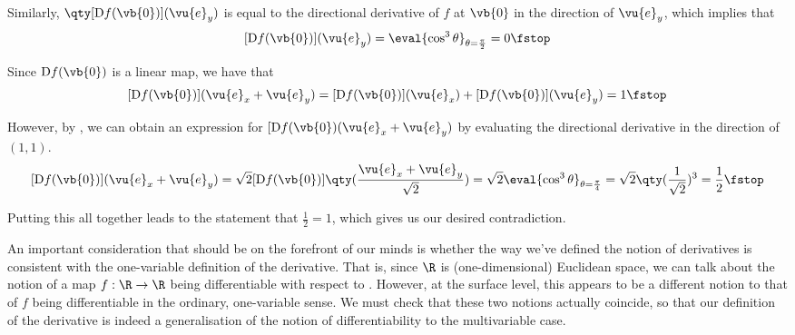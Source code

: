Similarly, \( \qty[\D f(\vb{0})](\vu{e}_y) \) is equal to the directional derivative of \( f \) at \( \vb{0} \) in the direction of \( \vu{e}_y \), which implies that
\[ [\D f(\vb{0})](\vu{e}_y)=\eval{\cos^3\theta}_{\theta=\frac{\pi}{2}}=0\fstop \]

Since \( \D f(\vb{0}) \) is a linear map, we have that
\[ [\D f(\vb{0})](\vu{e}_x+\vu{e}_y)=[\D f(\vb{0})](\vu{e}_x)+[\D f(\vb{0})](\vu{e}_y)=1\fstop \]

However, by , we can obtain an expression for \( [\D f(\vb{0})(\vu{e}_x+\vu{e}_y) \) by evaluating the directional derivative in the direction of \( (1,1) \).
\[ [\D f(\vb{0})](\vu{e}_x+\vu{e}_y)=\sqrt{2}[\D f(\vb{0})]\qty(\frac{\vu{e}_x+\vu{e}_y}{\sqrt{2}})=\sqrt{2}\eval{\cos^3\theta}_{\theta=\frac{\pi}{4}}=\sqrt{2}\qty(\frac{1}{\sqrt{2}})^3=\frac{1}{2}\fstop \]

Putting this all together leads to the statement that \( \frac{1}{2}=1 \), which gives us our desired contradiction.

\vspace{3mm}

An important consideration that should be on the forefront of our minds is whether the way we've defined the notion of derivatives is consistent with the one-variable definition of the derivative. That is, since \( \R \) is (one-dimensional) Euclidean space, we can talk about the notion of a map \( f:\R\to\R \) being differentiable with respect to . However, at the surface level, this appears to be a different notion to that of \( f \) being differentiable in the ordinary, one-variable sense. We must check that these two notions actually coincide, so that our definition of the derivative is indeed a generalisation of the notion of differentiability to the multivariable case.

